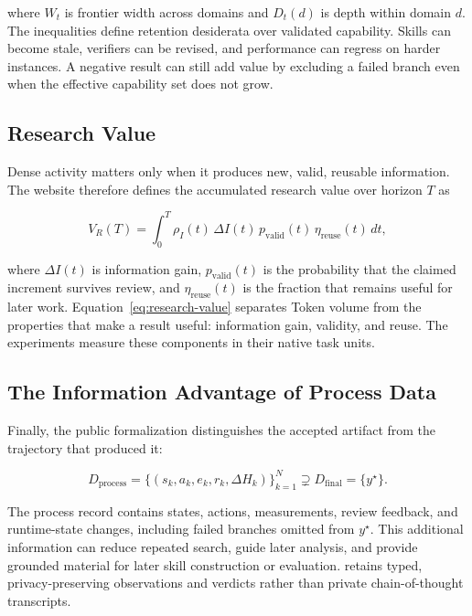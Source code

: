 where $W_t$ is frontier width across domains and $D_t(d)$ is depth within domain
$d$. The inequalities define retention desiderata over validated capability.
Skills can become stale, verifiers can be revised, and performance can regress on
harder instances. A negative result can still add value by excluding a failed branch even when the
effective capability set does not grow.

\subsection{Research Value}

Dense activity matters only when it produces new, valid, reusable information. The
website therefore defines the accumulated research value over horizon $T$ as

\begin{equation}
  V_R(T)
  =\int_0^T
  \rho_I(t)\,\Delta I(t)\,p_{\mathrm{valid}}(t)\,
  \eta_{\mathrm{reuse}}(t)\,dt,
  \label{eq:research-value}
\end{equation}

where $\Delta I(t)$ is information gain, $p_{\mathrm{valid}}(t)$ is the probability
that the claimed increment survives review, and
$\eta_{\mathrm{reuse}}(t)$ is the fraction that remains useful for later work.
Equation~\ref{eq:research-value} separates Token volume from the properties that
make a result useful: information gain, validity, and reuse. The experiments measure
these components in their native task units.

\subsection{The Information Advantage of Process Data}

Finally, the public formalization distinguishes the accepted artifact from the
trajectory that produced it:

\begin{equation}
  D_{\mathrm{process}}
  =\{(s_k,a_k,e_k,r_k,\Delta H_k)\}_{k=1}^{N}
  \supsetneq
  D_{\mathrm{final}}=\{y^\star\}.
  \label{eq:process-data}
\end{equation}

The process record contains states, actions, measurements, review feedback, and
runtime-state changes, including failed branches omitted from $y^\star$. This
additional information can reduce repeated search, guide later analysis, and provide
grounded material for later skill construction or evaluation. \systemname retains
typed, privacy-preserving observations and verdicts rather than private
chain-of-thought transcripts.

